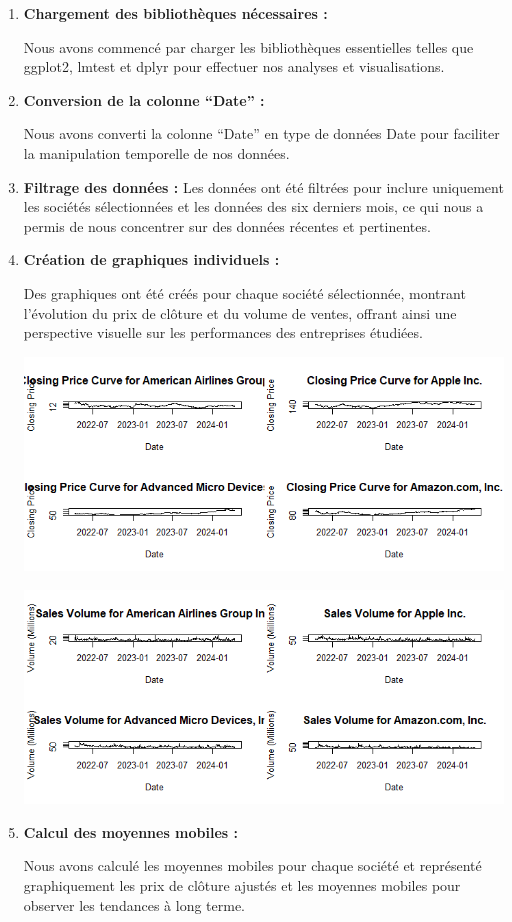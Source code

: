 \documentclass[
  letterpaper,
  DIV=11,
  numbers=noendperiod]{scrartcl}
\begin{document}
\begin{enumerate}
\def\labelenumi{\arabic{enumi}.}
\item
  \textbf{Chargement des bibliothèques nécessaires :}

  Nous avons commencé par charger les bibliothèques essentielles telles
  que ggplot2, lmtest et dplyr pour effectuer nos analyses et
  visualisations.
\item
  \textbf{Conversion de la colonne ``Date'' :}

  Nous avons converti la colonne ``Date'' en type de données Date pour
  faciliter la manipulation temporelle de nos données.
\item
  \textbf{Filtrage des données :} Les données ont été filtrées pour
  inclure uniquement les sociétés sélectionnées et les données des six
  derniers mois, ce qui nous a permis de nous concentrer sur des données
  récentes et pertinentes.
\item
  \textbf{Création de graphiques individuels :}

  Des graphiques ont été créés pour chaque société sélectionnée,
  montrant l'évolution du prix de clôture et du volume de ventes,
  offrant ainsi une perspective visuelle sur les performances des
  entreprises étudiées.

  \includegraphics{images/ClosingPriceCurevCompanies.png}

  \includegraphics{images/SlaesVolumeCompanies.png}
\item
  \textbf{Calcul des moyennes mobiles :}

  Nous avons calculé les moyennes mobiles pour chaque société et
  représenté graphiquement les prix de clôture ajustés et les moyennes
  mobiles pour observer les tendances à long terme.
\end{enumerate}
\end{document}
